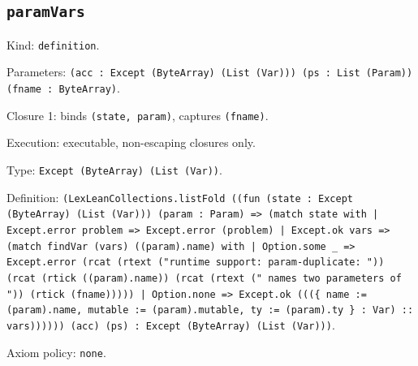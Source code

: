\documentclass[11pt]{article}
\begin{document}
\subsection*{\texttt{paramVars}}
\noindent Kind: \texttt{definition}.\par
\noindent Parameters: \texttt{(acc : Except (ByteArray) (List (Var))) (ps : List (Param)) (fname : ByteArray)}.\par
\noindent Closure 1: binds \texttt{(state, param)}, captures \texttt{(fname)}.\par
\noindent Execution: executable, non-escaping closures only.\par
\noindent Type: \texttt{Except (ByteArray) (List (Var))}.\par
\noindent Definition: \texttt{(LexLeanCollections.listFold ((fun (state : Except (ByteArray) (List (Var))) (param : Param) => (match state with | Except.error problem => Except.error (problem) | Except.ok vars => (match findVar (vars) ((param).name) with | Option.some \_ => Except.error (rcat (rtext ("runtime support: param-duplicate: ")) (rcat (rtick ((param).name)) (rcat (rtext (" names two parameters of ")) (rtick (fname))))) | Option.none => Except.ok (((\{ name := (param).name, mutable := (param).mutable, ty := (param).ty \} : Var) :: vars)))))) (acc) (ps) : Except (ByteArray) (List (Var)))}.\par
\noindent Axiom policy: \texttt{none}.\par
\end{document}
